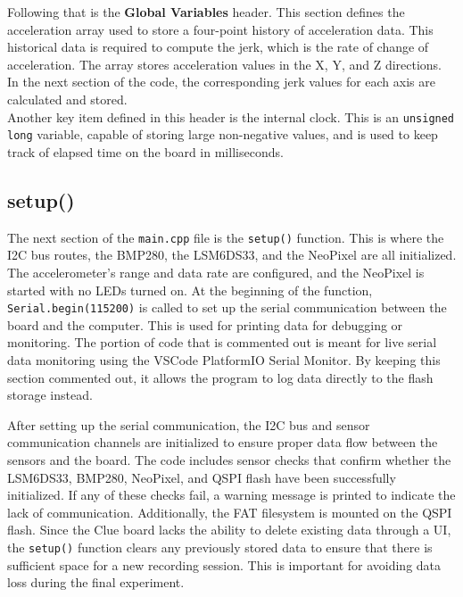 \documentclass[12pt]{report}
\begin{document}
Following that is the \textbf{Global Variables} header. This section defines the acceleration array used to store a four-point history of acceleration data. This historical data is required to compute the jerk, which is the rate of change of acceleration. The array stores acceleration values in the X, Y, and Z directions. In the next section of the code, the corresponding jerk values for each axis are calculated and stored. \\

Another key item defined in this header is the internal clock. This is an \texttt{unsigned long} variable, capable of storing large non-negative values, and is used to keep track of elapsed time on the board in milliseconds. \\















\subsection*{setup()}

The next section of the \texttt{main.cpp} file is the \texttt{setup()} function. This is where the I2C bus routes, the BMP280, the LSM6DS33, and the NeoPixel are all initialized. The accelerometer's range and data rate are configured, and the NeoPixel is started with no LEDs turned on. At the beginning of the function, \texttt{Serial.begin(115200)} is called to set up the serial communication between the board and the computer. This is used for printing data for debugging or monitoring. The portion of code that is commented out is meant for live serial data monitoring using the VSCode PlatformIO Serial Monitor. By keeping this section commented out, it allows the program to log data directly to the flash storage instead. \newline

After setting up the serial communication, the I2C bus and sensor communication channels are initialized to ensure proper data flow between the sensors and the board. The code includes sensor checks that confirm whether the LSM6DS33, BMP280, NeoPixel, and QSPI flash have been successfully initialized. If any of these checks fail, a warning message is printed to indicate the lack of communication. Additionally, the FAT filesystem is mounted on the QSPI flash. Since the Clue board lacks the ability to delete existing data through a UI, the \texttt{setup()} function clears any previously stored data to ensure that there is sufficient space for a new recording session. This is important for avoiding data loss during the final experiment. \newline
\end{document}
